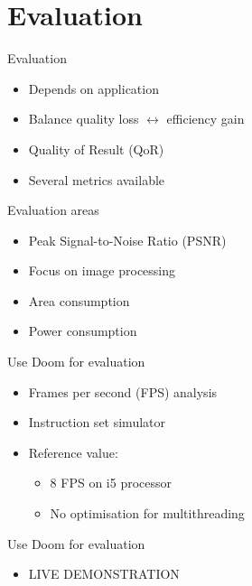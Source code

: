 \documentclass{beamer}
\begin{document}
\section{Evaluation}
\begin{frame}{Evaluation}
    \begin{itemize}
        \item<1-> Depends on application
        \item<2-> Balance quality loss $\leftrightarrow$ efficiency gain
        \item<3-> Quality of Result (QoR)
        \item<4-> Several metrics available
    \end{itemize}
\end{frame}

\begin{frame}{Evaluation areas}
    \begin{itemize}
        \item<1-> Peak Signal-to-Noise Ratio (PSNR)
        \item<2-> Focus on image processing
        \item<3-> Area consumption
        \item<4-> Power consumption
    \end{itemize}
\end{frame}

\begin{frame}{Use Doom for evaluation}
    \begin{itemize}
        \item<1-> Frames per second (FPS) analysis
        \item<2-> Instruction set simulator
        \item<3-> Reference value: 
            \begin{itemize}
                \item<1-> 8 FPS on i5 processor
                \item<2-> No optimisation for multithreading
            \end{itemize}
    \end{itemize}
\end{frame}

\begin{frame}{Use Doom for evaluation}
    \begin{itemize}
        \item<1-> LIVE DEMONSTRATION 
    \end{itemize}    
\end{frame}
\end{document}
